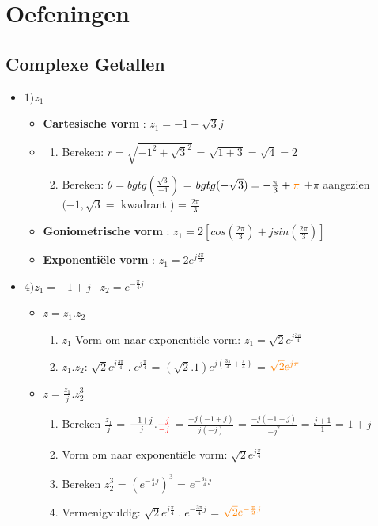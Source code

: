 \documentclass[12pt]{report}
\newcommand{\important}[1] {\textbf{\color{orange}#1}}
\newcommand{\mathimportant}[2] {\textbf{\color{#2}$#1$}}
\begin{document}
\part{Oefeningen}
\chapter{Complexe Getallen}
  \begin{itemize}
   \item $1)z_1$
   \begin{itemize}
     \item \important{Cartesische vorm} : $z_1 = -1 + \sqrt{3}j$
     \item \begin{enumerate}
            \item Bereken: $r = \sqrt{-1^2 + \sqrt{3}^2}$
			    = $\sqrt{1 + 3} = \sqrt{4} = 2$
	    \item Bereken: $\theta = bgtg(\frac{\sqrt{3}}{-1})$
			    = $bgtg(-\sqrt{3}) = -\frac{\pi}{3} + \mathimportant{\pi}{orange}$
			    \newline
			    $+\pi$ aangezien $(-1, \sqrt{3} =$ 
			    kwadrant \textup{\uppercase\expandafter{}})
			    = $\frac{2\pi}{3}$
           \end{enumerate}
     \item \important{Goniometrische vorm} : $z_1 = 2[cos(\frac{2\pi}{3}) + jsin(\frac{2\pi}{3})]$
     \item \important{Exponentiële vorm} : $z_1 = 2e^{j\frac{2\pi}{3}}$

    \end{itemize}
   \item $4)z_1 = - 1 + j\;\;\;z_2 = e^{-\frac{\pi}{4}j}$
   \begin{itemize}
    \item $z = z_1.\overline{z_2}$
     \begin{enumerate}
           \item $z_1$ Vorm om naar exponentiële vorm: $z_1 = \sqrt{2}e^{j\frac{3\pi}{4}}$
           \item $z_1 . \overline{z_2}$: $\sqrt{2}e^{j\frac{3\pi}{4}}\;.\;e^{j\frac{\pi}{4}}$
            = $(\sqrt{2} . 1)e^{j(\frac{3\pi}{4} + \frac{\pi}{4})}$ = $\mathimportant{\sqrt{2}e^{j\pi}}{orange}$
          \end{enumerate}
    \item $z = \frac{z_1}{j} . z^{3}_2$
      \begin{enumerate}
       \item Bereken $\frac{z_1}{j}$ = $\frac{-1 + j}{j} . \mathimportant{\frac{-j}{-j}}{red}$ = $\frac{-j(-1 + j)}{j(-j)}$
	= $\frac{-j(-1 + j)}{-j^2}$ = $\frac{j + 1}{1}$ = $1 + j$
	\item Vorm om naar exponentiële vorm: $\sqrt{2}e^{j\frac{\pi}{4}}$
	\item Bereken $z^{3}_2$ = $(e^{-\frac{\pi}{4}j})^3$ = $e^{-\frac{3\pi}{4}j}$
	\item Vermenigvuldig: $\sqrt{2}e^{j\frac{\pi}{4}}\;.\;e^{-\frac{3\pi}{4}j}$
	= $\mathimportant{\sqrt{2}e^{-\frac{\pi}{2}j}}{orange}$


\end{enumerate}
\end{itemize}
\end{itemize}
\end{document}
